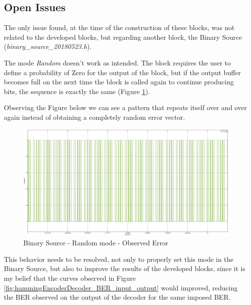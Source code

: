 \begin{refsection}
\subsection*{Open Issues}
\label{Open Issues}

The only issue found, at the time of the construction of these blocks, was not related to the developed blocks, but regarding another block, the Binary Source (\textit{binary\_source\_20180523.h}).

The mode \textit{Random} doesn't work as intended. The block requires the user to define a probability of Zero for the output of the block, but if the output buffer becomes full on the next time the block is called again to continue producing bits, the sequence is exactly the same (Figure \ref{fig:hammingEncoderDecoder_BinarySource_ERROR}). 

Observing the Figure below we can see a pattern that repeats itself over and over again instead of obtaining a completely random error vector.

\begin{figure}[h!]
	\centering
	\includegraphics[width=.9\linewidth]{./sdf/eit_25828_hamming_channel_encoder_decoder/images/ERROR.png}
	\vspace{-3mm}
	\caption{Binary Source - Random mode - Observed Error}
	\label{fig:hammingEncoderDecoder_BinarySource_ERROR}
\end{figure}

\vspace{30mm}

This behavior needs to be resolved, not only to properly set this mode in the Binary Source, but also to improve the results of the developed blocks, since it is my belief that the curves observed in Figure \ref{fig:hammingEncoderDecoder_BER_input_output} would improved, reducing the BER observed on the output of the decoder for the same imposed BER.




\clearpage
\printbibliography[heading=subbibliography]
\end{refsection}
\cleardoublepage
